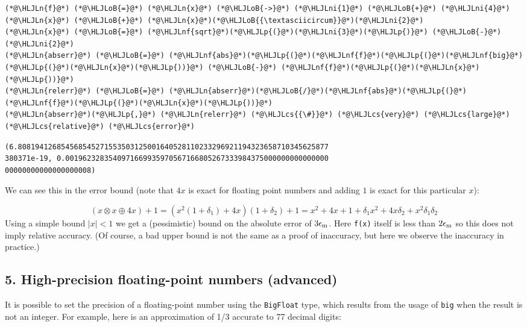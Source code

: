 \documentclass[12pt,a4paper]{article}
\newcommand{\HLJLn}[1]{#1}
\newcommand{\HLJLnf}[1]{\textcolor[RGB]{66,102,213}{#1}}
\newcommand{\HLJLni}[1]{\textcolor[RGB]{59,151,46}{#1}}
\newcommand{\HLJLoB}[1]{\textcolor[RGB]{102,102,102}{\textbf{#1}}}
\newcommand{\HLJLp}[1]{#1}
\newcommand{\HLJLcs}[1]{\textcolor[RGB]{153,153,119}{\textit{#1}}}
\begin{document}
\begin{lstlisting}
(*@\HLJLn{f}@*) (*@\HLJLoB{=}@*) (*@\HLJLn{x}@*) (*@\HLJLoB{->}@*) (*@\HLJLni{1}@*) (*@\HLJLoB{+}@*) (*@\HLJLni{4}@*)(*@\HLJLn{x}@*) (*@\HLJLoB{+}@*) (*@\HLJLn{x}@*)(*@\HLJLoB{{\textasciicircum}}@*)(*@\HLJLni{2}@*)
(*@\HLJLn{x}@*) (*@\HLJLoB{=}@*) (*@\HLJLnf{sqrt}@*)(*@\HLJLp{(}@*)(*@\HLJLni{3}@*)(*@\HLJLp{)}@*) (*@\HLJLoB{-}@*) (*@\HLJLni{2}@*)
(*@\HLJLn{abserr}@*) (*@\HLJLoB{=}@*) (*@\HLJLnf{abs}@*)(*@\HLJLp{(}@*)(*@\HLJLnf{f}@*)(*@\HLJLp{(}@*)(*@\HLJLnf{big}@*)(*@\HLJLp{(}@*)(*@\HLJLn{x}@*)(*@\HLJLp{))}@*) (*@\HLJLoB{-}@*) (*@\HLJLnf{f}@*)(*@\HLJLp{(}@*)(*@\HLJLn{x}@*)(*@\HLJLp{))}@*)
(*@\HLJLn{relerr}@*) (*@\HLJLoB{=}@*) (*@\HLJLn{abserr}@*)(*@\HLJLoB{/}@*)(*@\HLJLnf{abs}@*)(*@\HLJLp{(}@*)(*@\HLJLnf{f}@*)(*@\HLJLp{(}@*)(*@\HLJLn{x}@*)(*@\HLJLp{))}@*)
(*@\HLJLn{abserr}@*)(*@\HLJLp{,}@*) (*@\HLJLn{relerr}@*) (*@\HLJLcs{{\#}}@*) (*@\HLJLcs{very}@*) (*@\HLJLcs{large}@*) (*@\HLJLcs{relative}@*) (*@\HLJLcs{error}@*)
\end{lstlisting}

\begin{lstlisting}
(6.808194126854568545271553503125001640528110233296921194323658710345625877
380371e-19, 0.0019623283540971669935970567166805267333984375000000000000000
00000000000000000008)
\end{lstlisting}


We can see this in the error bound (note that $4x$ is exact for floating point numbers and adding $1$ is exact for this particular $x$):

\[
(x \otimes x \oplus 4x) + 1 = (x^2 (1 + \delta_1) + 4x)(1+\delta_2) + 1 = x^2 + 4x + 1 + \delta_1 x^2 + 4x \delta_2 + x^2 \delta_1 \delta_2
\]
Using a simple bound $|x| < 1$ we get a (pessimistic) bound on the absolute error of $3 \ensuremath{\epsilon}_{\rm m}$. Here \texttt{f(x)} itself is less than $2 \ensuremath{\epsilon}_{\rm m}$ so this does not imply relative accuracy. (Of course, a bad upper bound is not the same as a proof of inaccuracy, but here we observe the inaccuracy in practice.)

\subsection{5. High-precision floating-point numbers (advanced)}
It is possible to set the precision of a floating-point number using the \texttt{BigFloat} type, which results from the usage of \texttt{big} when the result is not an integer. For example, here is an approximation of 1/3 accurate to 77 decimal digits:
\end{document}
